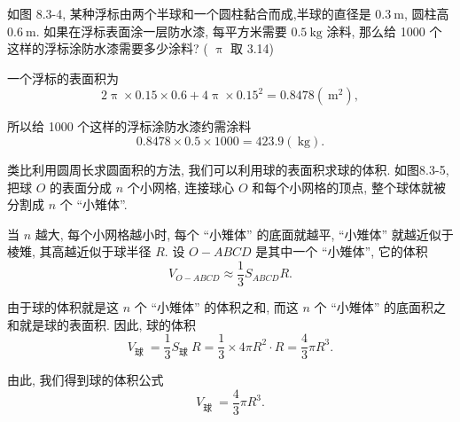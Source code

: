 \begin{example}
	如图 8.3-4, 某种浮标由两个半球和一个圆柱黏合而成,半球的直径是 $0.3 \mathrm{~m}$, 圆柱高 $0.6 \mathrm{~m}$. 如果在浮标表面涂一层防水漆, 每平方米需要 $0.5 \mathrm{~kg}$ 涂料, 那么给 1000 个这样的浮标涂防水漆需要多少涂料? ( $\uppi$ 取 3.14)
\end{example}
\begin{solution}
一个浮标的表面积为
	$$
		2 \uppi \times 0.15 \times 0.6+4 \uppi \times 0.15^2=0.8478\left(\mathrm{~m}^2\right),
	$$

	所以给 1000 个这样的浮标涂防水漆约需涂料
	$$
		0.8478 \times 0.5 \times 1000=423.9(\mathrm{~kg}) .
	$$
\end{solution}


类比利用圆周长求圆面积的方法, 我们可以利用球的表面积求球的体积. 如图8.3-5,把球 $O$ 的表面分成 $n$ 个小网格, 连接球心 $O$ 和每个小网格的顶点, 整个球体就被分割成 $n$ 个 “小雉体”.

当 $n$ 越大, 每个小网格越小时, 每个 “小雉体” 的底面就越平, “小雉体” 就越近似于棱雉, 其高越近似于球半径 $R$. 设 $O-A B C D$ 是其中一个 “小雉体”, 它的体积
$$
V_{O-A B C D} \approx \frac{1}{3} S_{A B C D} R . 
$$

由于球的体积就是这 $n$ 个 “小雉体” 的体积之和, 而这 $n$ 个 “小雉体” 的底面积之和就是球的表面积. 因此, 球的体积
$$
V_{\text {球 }}=\frac{1}{3} S_{\text {球 }} R=\frac{1}{3} \times 4 \pi R^2 \cdot R=\frac{4}{3} \pi R^3 . 
$$

由此, 我们得到球的体积公式
$$
V_{\text {球 }}=\frac{4}{3} \pi R^3 .
$$
